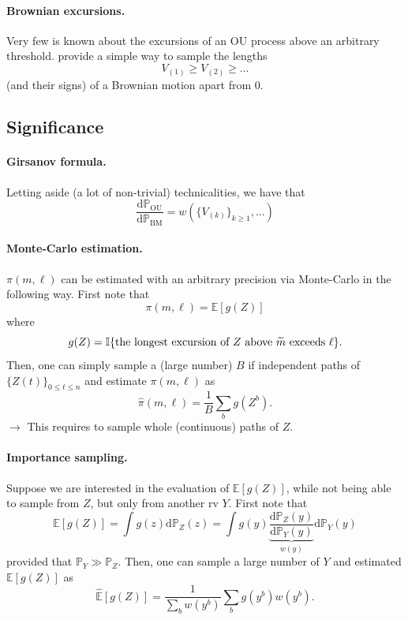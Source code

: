 \documentclass[a4paper,12pt]{article}
\newcommand{\BM}{\text{BM}}
\newcommand{\dd}{\text{d}}
\newcommand{\Esp}{\mathbb{E}}
\newcommand{\Ibb}{\mathbb{I}}
\newcommand{\OU}{\text{OU}}
\newcommand{\Pbb}{\mathbb{P}}
\newcommand{\ra}{$\rightarrow$ \xspace}
\begin{document}

\paragraph{Brownian excursions.} Very few is known about the excursions of an $\OU$ process above an arbitrary threshold. \cite{PiY97} provide a simple way to sample the lengths 
$$
V_{(1)} \geq V_{(2)} \geq \dots
$$
(and their signs) of a Brownian motion apart from 0.

\subsection{Significance}


\paragraph{Girsanov formula.} Letting aside (a lot of non-trivial) technicalities, we have that
$$
\frac{\dd \Pbb_{\OU}}{\dd \Pbb_{\BM}} = w(\{V_{(k)}\}_{k \geq 1}, ...)
$$

\paragraph{Monte-Carlo estimation.} $\pi(m, \ell)$ can be estimated with an arbitrary precision via Monte-Carlo in the following way. First note that
$$
\pi(m, \ell) = \Esp[g(Z)]
$$
where 
$$
g(Z) = \Ibb\{\text{the longest excursion of $Z$ above $\mt$ exceeds $\ell$}\}.
$$
Then, one can simply sample a (large number) $B$ if independent paths of $\{Z(t)\}_{0 \leq t \leq n}$ and estimate $\pi(m, \ell)$ as
$$
\widehat{\pi}(m, \ell) = \frac1B \sum_b g(Z^b).
$$
\ra This requires to sample whole (continuous) paths of $Z$.

\paragraph{Importance sampling.} Suppose we are interested in the evaluation of $\Esp[g(Z)]$, while not being able to sample from $Z$, but only from another rv $Y$. First note that
$$
\Esp[g(Z)] = \int g(z) \dd \Pbb_Z(z) = \int g(y) \underset{w(y)}{\underbrace{\frac{\dd \Pbb_Z(y)}{\dd \Pbb_Y(y)}}} \dd \Pbb_Y(y)
$$
provided that $\Pbb_Y \gg \Pbb_Z$. Then, one can sample a large number of $Y$ and estimated $\Esp[g(Z)]$ as
$$
\widehat{\Esp}[g(Z)] = \frac1{\sum_b w(y^b)} \sum_b g(y^b) w(y^b). 
$$
\end{document}
